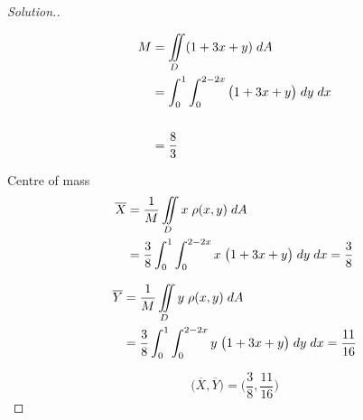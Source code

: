 \documentclass[11pt,a4paper]{article}
\theoremstyle{definition}
\newenvironment{solution}
  {\renewcommand{\qedsymbol}{}\begin{proof}[\textit{Solution}.]}
  {\end{proof}}
\begin{document}
\begin{solution}


\begin{figure}[H]
\centering
{}
\end{figure}

\begin{align*}
M & = \iint\limits_D (1 + 3x + y)\hspace{0.1cm} dA\\
& = \int^1_0 \int^{2-2x}_0\big(1 + 3x + y\big)\hspace{0.1cm} dy \hspace{0.1cm} dx\\\\
& = \frac{8}{3}\\
\end{align*}

Centre of mass
\begin{align*}
\overline{X} & = \frac{1}{M} \iint\limits_D x \hspace{0.1cm} \rho (x,y)\hspace{0.1cm} dA\\
& = \frac{3}{8}\int^1_0 \int^{2 - 2x}_0 x \hspace{0.1cm} \big(1 + 3x + y\big) \hspace{0.1cm}dy \hspace{0.1cm} dx
  = \frac{3}{8}\\
\end{align*}

\begin{align*}
\overline{Y} & = \frac{1}{M} \iint\limits_D y \hspace{0.1cm} \rho (x,y)\hspace{0.1cm} dA\\
& = \frac{3}{8}\int^1_0 \int^{2 - 2x}_0 y \hspace{0.1cm} \big(1 + 3x + y\big) \hspace{0.1cm}dy \hspace{0.1cm} dx
  = \frac{11}{16}\\
\end{align*} 

$$\big(\overline{X},\overline{Y}\big) = \Bigg( \frac{3}{8},\frac{11}{16}\Bigg)$$
\end{solution}
\end{document}
